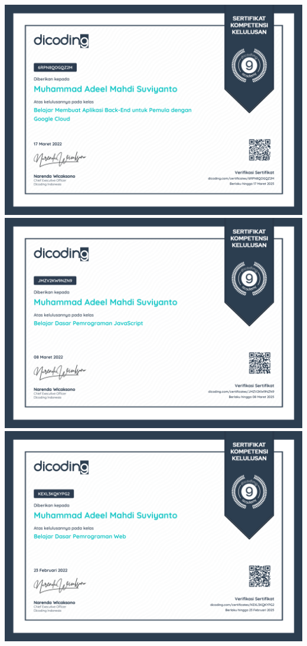 \includegraphics[scale=0.5]{./assets/dicodingbackend}\\
\includegraphics[scale=0.5]{./assets/dicodingjs}\\
\includegraphics[scale=0.5]{./assets/dicodingweb}\\
